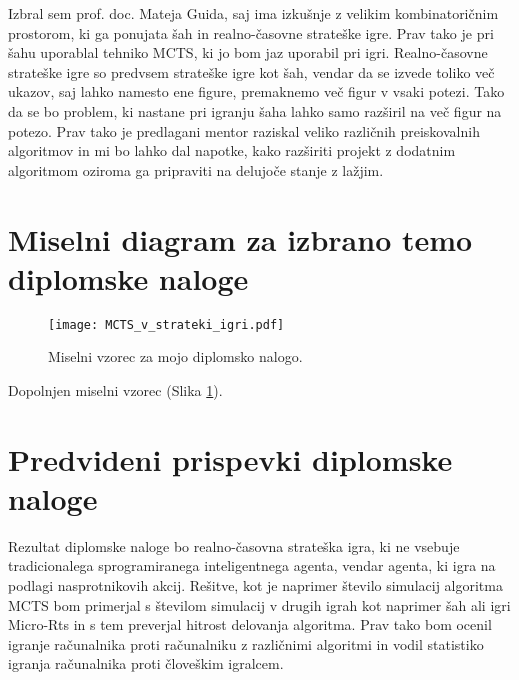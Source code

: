 \documentclass[11pt,a4paper]{article}
\begin{document}
Izbral sem prof. doc. Mateja Guida, saj ima izkušnje z velikim kombinatoričnim prostorom, ki ga ponujata šah in realno-časovne strateške igre. Prav tako je pri šahu uporablal tehniko MCTS, ki jo bom jaz uporabil pri igri.
Realno-časovne strateške igre so predvsem strateške igre kot šah, vendar da se izvede toliko več ukazov, saj lahko namesto ene figure, premaknemo več figur v vsaki potezi. Tako da se bo problem, ki nastane pri igranju šaha lahko samo razširil na več figur na potezo.
Prav tako je predlagani mentor raziskal veliko različnih preiskovalnih algoritmov in mi bo lahko dal napotke, kako razširiti projekt z dodatnim algoritmom oziroma ga pripraviti na delujoče stanje z lažjim.





\section{Miselni diagram za izbrano temo diplomske naloge}

\begin{figure}[htb!]
\centerline{\texttt{[image: MCTS\_v\_strateki\_igri.pdf]}}
\caption{Miselni vzorec za mojo diplomsko nalogo.}
\label{sl:mindmap}
\end{figure}

Dopolnjen miselni vzorec (Slika \ref{sl:mindmap}).


\section{Predvideni prispevki diplomske naloge}

Rezultat diplomske naloge bo realno-časovna strateška igra, ki ne vsebuje tradicionalega sprogramiranega inteligentnega agenta, vendar agenta, ki igra na podlagi nasprotnikovih akcij.
Rešitve, kot je naprimer število simulacij algoritma MCTS bom primerjal s številom simulacij v drugih igrah kot naprimer šah ali igri Micro-Rts in s tem preverjal hitrost delovanja algoritma.
Prav tako bom ocenil igranje računalnika proti računalniku z različnimi algoritmi in vodil statistiko igranja računalnika proti človeškim igralcem.



\end{document}
